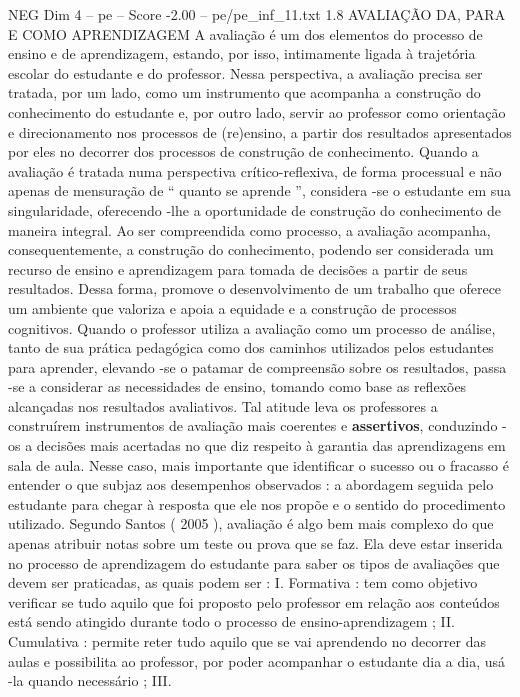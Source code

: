\begin{textsample}{NEG Dim 4 – pe – Score -2.00 – pe/pe\_inf\_11.txt}  \label{ex:f4_neg_007}
1.8 AVALIAÇÃO DA, PARA E COMO APRENDIZAGEM A avaliação é um dos elementos do processo de ensino e de aprendizagem, estando, por isso, intimamente ligada à trajetória escolar do estudante e do professor.
Nessa perspectiva, a avaliação precisa ser tratada, por um lado, como um instrumento que acompanha a construção do conhecimento do estudante e, por outro lado, servir ao professor como orientação e direcionamento nos processos de (re)ensino, a partir dos resultados apresentados por eles no decorrer dos processos de construção de conhecimento.
Quando a avaliação é tratada numa perspectiva crítico-reflexiva, de forma processual e não apenas de mensuração de “ quanto se aprende ”, considera -se o estudante em sua singularidade, oferecendo -lhe a oportunidade de construção do conhecimento de maneira integral.
Ao ser compreendida como processo, a avaliação acompanha, consequentemente, a construção do conhecimento, podendo ser considerada um recurso de ensino e aprendizagem para tomada de decisões a partir de seus resultados.
Dessa forma, promove o desenvolvimento de um trabalho que oferece um ambiente que valoriza e apoia a equidade e a construção de processos cognitivos.
Quando o professor utiliza a avaliação como um processo de análise, tanto de sua prática pedagógica como dos caminhos utilizados pelos estudantes para aprender, elevando -se o patamar de compreensão sobre os resultados, passa -se a considerar as necessidades de ensino, tomando como base as reflexões alcançadas nos resultados avaliativos.
Tal atitude leva os professores a construírem instrumentos de avaliação mais coerentes e \textbf{assertivos}, conduzindo -os a decisões mais acertadas no que diz respeito à garantia das aprendizagens em sala de aula.
Nesse caso, mais importante que identificar o sucesso ou o fracasso é entender o que subjaz aos desempenhos observados : a abordagem seguida pelo estudante para chegar à resposta que ele nos propõe e o sentido do procedimento utilizado.
Segundo Santos ( 2005 ), avaliação é algo bem mais complexo do que apenas atribuir notas sobre um teste ou prova que se faz.
Ela deve estar inserida no processo de aprendizagem do estudante para saber os tipos de avaliações que devem ser praticadas, as quais podem ser : I.
Formativa : tem como objetivo verificar se tudo aquilo que foi proposto pelo professor em relação aos conteúdos está sendo atingido durante todo o processo de ensino-aprendizagem ; II.
Cumulativa : permite reter tudo aquilo que se vai aprendendo no decorrer das aulas e possibilita ao professor, por poder acompanhar o estudante dia a dia, usá -la quando necessário ; III.

\end{textsample}
